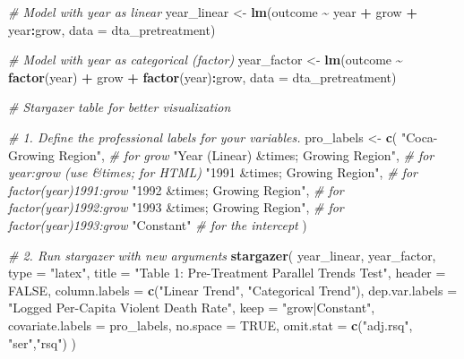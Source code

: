 \documentclass[
]{article}
\newenvironment{Shaded}{\begin{snugshade}}{\end{snugshade}}
\newcommand{\AttributeTok}[1]{\textcolor[rgb]{0.13,0.29,0.53}{#1}}
\newcommand{\CommentTok}[1]{\textcolor[rgb]{0.56,0.35,0.01}{\textit{#1}}}
\newcommand{\ConstantTok}[1]{\textcolor[rgb]{0.56,0.35,0.01}{#1}}
\newcommand{\FunctionTok}[1]{\textcolor[rgb]{0.13,0.29,0.53}{\textbf{#1}}}
\newcommand{\NormalTok}[1]{#1}
\newcommand{\OtherTok}[1]{\textcolor[rgb]{0.56,0.35,0.01}{#1}}
\newcommand{\SpecialCharTok}[1]{\textcolor[rgb]{0.81,0.36,0.00}{\textbf{#1}}}
\newcommand{\StringTok}[1]{\textcolor[rgb]{0.31,0.60,0.02}{#1}}
\begin{document}
\begin{Shaded}
\begin{Highlighting}[]
\CommentTok{\# Model with year as linear}
\NormalTok{year\_linear }\OtherTok{\textless{}{-}} \FunctionTok{lm}\NormalTok{(outcome }\SpecialCharTok{\textasciitilde{}}\NormalTok{ year }\SpecialCharTok{+}\NormalTok{ grow }\SpecialCharTok{+}\NormalTok{ year}\SpecialCharTok{:}\NormalTok{grow, }\AttributeTok{data =}\NormalTok{ dta\_pretreatment)}

\CommentTok{\# Model with year as categorical (factor)}
\NormalTok{year\_factor }\OtherTok{\textless{}{-}} \FunctionTok{lm}\NormalTok{(outcome }\SpecialCharTok{\textasciitilde{}} \FunctionTok{factor}\NormalTok{(year) }\SpecialCharTok{+}\NormalTok{ grow }\SpecialCharTok{+} \FunctionTok{factor}\NormalTok{(year)}\SpecialCharTok{:}\NormalTok{grow, }\AttributeTok{data =}\NormalTok{ dta\_pretreatment)}

\CommentTok{\# Stargazer table for better visualization}

\CommentTok{\# 1. Define the professional labels for your variables.}
\NormalTok{pro\_labels }\OtherTok{\textless{}{-}} \FunctionTok{c}\NormalTok{(}
  \StringTok{"Coca{-}Growing Region"}\NormalTok{,              }\CommentTok{\# for \textquotesingle{}grow\textquotesingle{}}
  \StringTok{"Year (Linear) \&times; Growing Region"}\NormalTok{, }\CommentTok{\# for \textquotesingle{}year:grow\textquotesingle{} (use \&times; for HTML)}
  \StringTok{"1991 \&times; Growing Region"}\NormalTok{,          }\CommentTok{\# for \textquotesingle{}factor(year)1991:grow\textquotesingle{}}
  \StringTok{"1992 \&times; Growing Region"}\NormalTok{,          }\CommentTok{\# for \textquotesingle{}factor(year)1992:grow\textquotesingle{}}
  \StringTok{"1993 \&times; Growing Region"}\NormalTok{,          }\CommentTok{\# for \textquotesingle{}factor(year)1993:grow\textquotesingle{}}
  \StringTok{"Constant"}                        \CommentTok{\# for the intercept}
\NormalTok{)}

\CommentTok{\# 2. Run stargazer with new arguments}
\FunctionTok{stargazer}\NormalTok{(}
\NormalTok{  year\_linear, year\_factor,}
  \AttributeTok{type =} \StringTok{"latex"}\NormalTok{, }
  \AttributeTok{title =} \StringTok{"Table 1: Pre{-}Treatment Parallel Trends Test"}\NormalTok{,}
  \AttributeTok{header =} \ConstantTok{FALSE}\NormalTok{,}
  \AttributeTok{column.labels =} \FunctionTok{c}\NormalTok{(}\StringTok{"Linear Trend"}\NormalTok{, }\StringTok{"Categorical Trend"}\NormalTok{),}
  \AttributeTok{dep.var.labels =} \StringTok{"Logged Per{-}Capita Violent Death Rate"}\NormalTok{,}
  \AttributeTok{keep =} \StringTok{"grow|Constant"}\NormalTok{,}
  \AttributeTok{covariate.labels =}\NormalTok{ pro\_labels,}
  \AttributeTok{no.space =} \ConstantTok{TRUE}\NormalTok{,}
  \AttributeTok{omit.stat =} \FunctionTok{c}\NormalTok{(}\StringTok{"adj.rsq"}\NormalTok{, }\StringTok{"ser"}\NormalTok{,}\StringTok{"rsq"}\NormalTok{)}
\NormalTok{)}
\end{Highlighting}
\end{Shaded}
\end{document}
